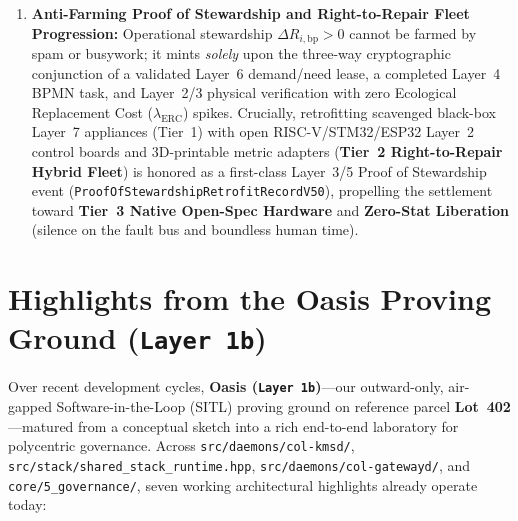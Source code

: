 \begin{enumerate}
        Physical conflicts never stall behind hours-long committee debates. On the \textbf{Fast
        Path}, every capability lease carries a mandatory finite \texttt{lease\_ttl\_ms}, and acute
        Layer~2 physical hazard telemetry (such as a burst water pipe requiring an $8{,}200\,\mathrm{cB}$
        wet-vac extraction) immediately preempts lower-tier leases (such as a $4{,}500\,\mathrm{cB}$
        studio quiet-hours lease) in millisecond hardware time. On the \textbf{Slow Path}, unmapped
        Layer~4 hard-blocks escalate through \texttt{col-kmsd} to Layer~6 (\texttt{col-commonsd})
        for decompilation into a human-readable \textbf{Semantic Diff Card}; once ratified via
        $V_i(t) = 1 + R_i(t)$, the resolution compiles back down into Layer~4 as a permanent BPMN
        guard predicate so the community never votes on the same conflict twice.
\item \textbf{Anti-Farming Proof of Stewardship and Right-to-Repair Fleet Progression:}
        Operational stewardship $\Delta R_{i,\mathrm{bp}} > 0$ cannot be farmed by spam or busywork;
        it mints \textit{solely} upon the three-way cryptographic conjunction of a validated Layer~6
        demand/need lease, a completed Layer~4 BPMN task, and Layer~2/3 physical verification with
        zero Ecological Replacement Cost ($\lambda_{\mathrm{ERC}}$) spikes. Crucially, retrofitting
        scavenged black-box Layer~7 appliances (Tier~1) with open RISC-V/STM32/ESP32 Layer~2 control
        boards and 3D-printable metric adapters (\textbf{Tier~2 Right-to-Repair Hybrid Fleet}) is
        honored as a first-class Layer~3/5 Proof of Stewardship event
        (\texttt{ProofOfStewardshipRetrofitRecordV50}), propelling the settlement toward
        \textbf{Tier~3 Native Open-Spec Hardware} and \textbf{Zero-Stat Liberation} (silence on the
        fault bus and boundless human time).
\end{enumerate}

\section*{Highlights from the Oasis Proving Ground (\texttt{Layer 1b})}

Over recent development cycles, \textbf{Oasis (\texttt{Layer 1b})}---our outward-only,
air-gapped Software-in-the-Loop (SITL) proving ground on reference parcel
\textbf{Lot~402} \parencite{grieves2014digital}---matured from a conceptual sketch into a rich
end-to-end laboratory for polycentric governance. Across \texttt{src/daemons/col-kmsd/},
\texttt{src/stack/shared\_stack\_runtime.hpp}, \texttt{src/daemons/col-gatewayd/}, and
\texttt{core/5\_governance/}, seven working architectural highlights already operate today:

